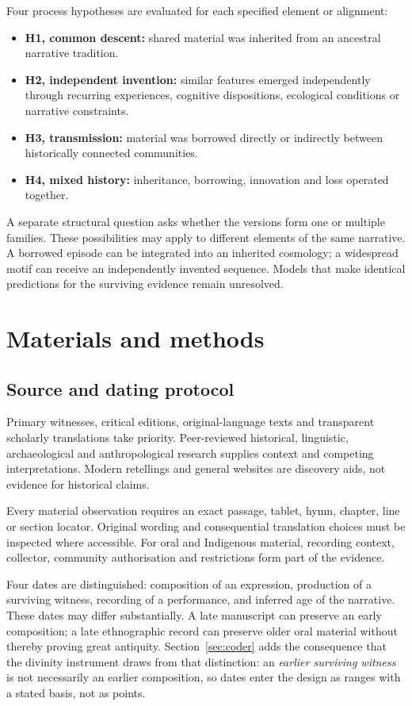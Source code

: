 \documentclass[11pt]{article}
\DeclareRobustCommand{\_}{\textunderscore\allowbreak}
\begin{document}
Four process hypotheses are evaluated for each specified element or alignment:
\begin{itemize}
  \item \textbf{H1, common descent:} shared material was inherited from an
        ancestral narrative tradition.
  \item \textbf{H2, independent invention:} similar features emerged
        independently through recurring experiences, cognitive dispositions,
        ecological conditions or narrative constraints.
  \item \textbf{H3, transmission:} material was borrowed directly or indirectly
        between historically connected communities.
  \item \textbf{H4, mixed history:} inheritance, borrowing, innovation and loss
        operated together.
\end{itemize}
A separate structural question asks whether the versions form one or multiple
families. These possibilities may apply to different elements of the same
narrative. A borrowed episode can be integrated into an inherited cosmology; a
widespread motif can receive an independently invented sequence. Models that make
identical predictions for the surviving evidence remain unresolved.

\section{Materials and methods}

\subsection{Source and dating protocol}

Primary witnesses, critical editions, original-language texts and transparent
scholarly translations take priority. Peer-reviewed historical, linguistic,
archaeological and anthropological research supplies context and competing
interpretations. Modern retellings and general websites are discovery aids, not
evidence for historical claims.

Every material observation requires an exact passage, tablet, hymn, chapter,
line or section locator. Original wording and consequential translation choices
must be inspected where accessible. For oral and Indigenous material, recording
context, collector, community authorisation and restrictions form part of the
evidence.

Four dates are distinguished: composition of an expression, production of a
surviving witness, recording of a performance, and inferred age of the narrative.
These dates may differ substantially. A late manuscript can preserve an early
composition; a late ethnographic record can preserve older oral material without
thereby proving great antiquity. Section~\ref{sec:coder} adds the consequence
that the divinity instrument draws from that distinction: an \emph{earlier
surviving witness} is not necessarily an earlier composition, so dates enter the
design as ranges with a stated basis, not as points.
\end{document}
